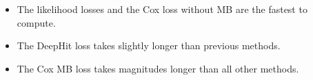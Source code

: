 \documentclass[portrait, color=UCLburgundy, margin=1cm]{uclposter}
\begin{document}
\begin{multicols}{2}
\begin{highlightbox}[UCLlightgreen]
\begin{itemize}
                    \begin{itemize}
                        \item The likelihood losses and the Cox loss without \gls{MB} are the fastest to compute.
                        
                        \item The DeepHit loss takes slightly longer than previous methods.
                        
                        \item The Cox \gls{MB} loss takes magnitudes longer than all other methods.
                    \end{itemize}
                \end{itemize}
            \end{highlightbox}
        
        \AtNextBibliography{\small}
        \printbibliography
    \end{multicols}
\end{document}
